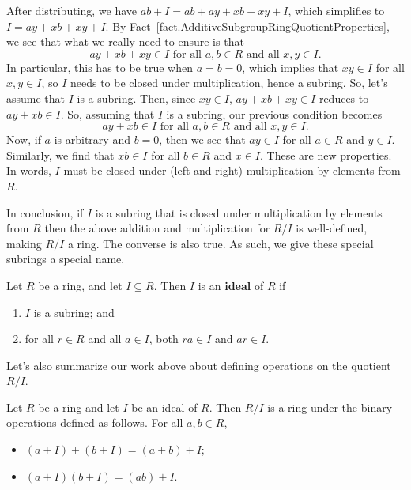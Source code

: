 After distributing, we have $ab + I = ab + ay + xb + xy +I$, which simplifies to $I = ay + xb + xy +I$. By Fact~\ref{fact.AdditiveSubgroupRingQuotientProperties}, we see that what we really need to ensure is that 
\[ay + xb + xy\in I \text{ for all $a,b\in R$ and all $x,y\in I$}.\] 
In particular, this has to be true when $a=b=0$, which implies that $xy\in I$ for all $x,y\in I$, so $I$ needs to be closed under multiplication, hence a subring. So, let's assume that $I$ is a subring. Then, since $xy \in I$,  $ay + xb + xy\in I$ reduces to $ay + xb\in I$. So, assuming that $I$ is a subring, our previous condition becomes
\[ay + xb\in I \text{ for all $a,b\in R$ and all $x,y\in I$}.\] 
Now, if $a$ is arbitrary and $b=0$, then we see that $ay \in I$ for all $a\in R$ and $y\in I$. Similarly, we find that $xb \in I$ for all $b\in R$ and $x\in I$. These are new properties. In words, $I$ must be closed under (left and right) multiplication by elements from $R$. 

In conclusion, if $I$ is a subring that is closed under multiplication by elements from $R$ then the above addition and multiplication for $R/I$ is well-defined, making $R/I$ a ring. The converse is also true. As such, we give these special subrings a special name.

\begin{definition}
Let $R$ be a ring, and let $I\subseteq R$. Then $I$ is an \textbf{ideal} of $R$ if  
\begin{enumerate}
\item $I$ is a subring; and 
\item for all $r\in R$ and all $a\in I$, both $ra\in I$ and $ar\in I$.
\end{enumerate}
\end{definition}

Let's also summarize our work above about defining operations on the quotient $R/I$.

\begin{fact}\label{fact.QuotientRing}
Let $R$ be a ring and let $I$ be an ideal of $R$.  Then $R/I$ is a ring under the binary operations defined as follows. For all $a,b\in R$, 
\begin{itemize}
\item $(a+I)+(b+I)  =  (a+b)+I$;
\item $(a+I)(b+I)  = (ab)+I.$
\end{itemize}
\end{fact}

